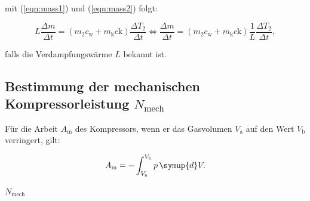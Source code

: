         mit (\ref{eqn:mass1}) und (\ref{eqn:mass2}) folgt:

        \begin{equation}
            L \frac{\Delta m}{\Delta t} = \left( m_2  c_\text{w} + m_\text{k} c\text{k}\right) \frac{\Delta T_2}{\Delta t} \iff \frac{\Delta m}{\Delta t} = \left( m_2  c_\text{w} + m_\text{k} c\text{k}\right) \frac{1}{L} \frac{\Delta T_2}{\Delta t},
        \end{equation}
        
        falls die Verdampfungswärme $L$ bekannt ist.


        \subsection{Bestimmung der mechanischen Kompressorleistung $N_\text{mech}$}

        Für die Arbeit $A_\text{m}$ des Kompressors, wenn er das Gasvolumen $V_\text{a}$ auf den Wert $V_\text{b}$ verringert, gilt:

        \begin{equation}
            A_\text{m} = - \int_{V_\text{a}}^{V_\text{b}} p \, \symup{d}V.
        \end{equation}

        $N_\text{mech}$

